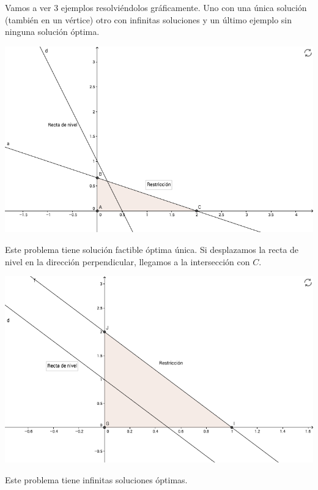 Vamos a ver 3 ejemplos resolviéndolos gráficamente. Uno con una única solución (también en un vértice) otro con infinitas soluciones y un último ejemplo sin ninguna solución óptima.

\begin{example}

\begin{ioprob}
\end{ioprob}

\begin{center}
\includegraphics[scale=0.45]{img/io-intro_1.png}
\end{center}

Este problema tiene solución factible óptima única. Si desplazamos la recta de nivel en la dirección perpendicular, llegamos a la intersección con $C$.
\end{example}

\begin{example}
\begin{ioprob} 
\end{ioprob}


\begin{center}
\includegraphics[scale=0.45]{img/io-intro_2.png}
\end{center}


Este problema tiene infinitas soluciones óptimas.
\end{example}

